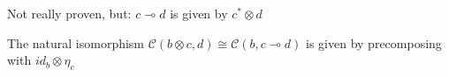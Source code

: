 Not really proven, but: $c \multimap d$ is given by $c^* \otimes d$

The natural isomorphism $\mathcal{C}(b \otimes c, d)\cong \mathcal{C}(b,c \multimap d)$ is given by precomposing with $id_b \otimes \eta_c$